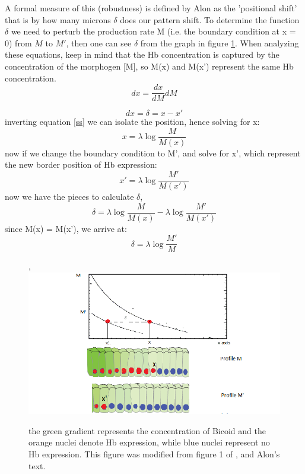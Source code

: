   A formal measure of this (robustness) is defined by Alon as the 'positional shift' that is by how many microns $\delta $ does our pattern shift.  To determine the function $\delta $ we need to perturb the production rate M (i.e. the boundary condition at x = 0) from $M$ to $M'$, then one can see $\delta $ from the graph in figure \ref{shift}.  When analyzing these equations, keep in mind that the Hb concentration is captured by the concentration of the morphogen [M], so M(x) and M(x') represent the same Hb concentration.
  \begin{equation}\label{inverse}
    d x = \frac{d x }{d M} dM
  \end{equation}

\begin{equation}\label{solvex}
    dx = \delta = x - x'
  \end{equation}
  inverting equation \eqref{ss} we can isolate the position, hence solving for x:
  \begin{equation}\label{}
   x = \lambda \log{\frac{M}{M(x)}}
  \end{equation}
  now if we change the boundary condition to M', and solve for x', which represent the new border position of Hb expression:
  \begin{equation}\label{}
  x' = \lambda \log{\frac{M'}{M(x')}}
  \end{equation}
  now we have the pieces to calculate $\delta$,
  \begin{equation}\label{}
     \delta = \lambda \log{\frac{M}{M(x)} }- \lambda \log{\frac{M'}{M(x')}}
  \end{equation}
  since M(x) = M(x'), we arrive at:
  \begin{equation}\label{}
  \delta =  \lambda\log{\frac{M'}{M}}
  \end{equation}

\begin{figure},
  \includegraphics[width=1\textwidth]{sourcegraph}\\
  \caption{the green gradient represents the concentration of Bicoid and the orange nuclei denote Hb expression, while blue nuclei represent no Hb expression.  This figure was modified from figure 1 of \cite{pmid20066104}, and Alon's text\cite{designp}.}\label{shift}
\end{figure}

